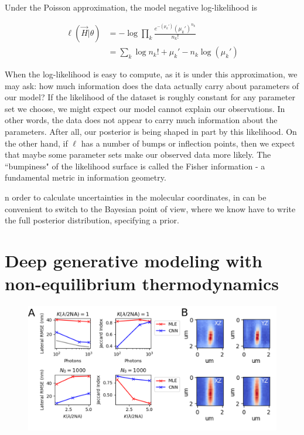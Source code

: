 \documentclass{ucetd}
\begin{document}
Under the Poisson approximation, the model negative log-likelihood is

\begin{align}
\ell(\vec{H}|\theta) &= -\log \prod_{k} \frac{e^{-\left(\mu_{k}'\right)}\left(\mu_{k}'\right)^{n_{k}}}{n_{k}!}\\
&= \sum_{k}  \log n_{k}! + \mu_{k}' - n_{k}\log\left(\mu_{k}'\right)
\end{align}

When the log-likelihood is easy to compute, as it is under this approximation, we may ask: how much information does the data actually carry about parameters of our model? If the likelihood of the dataset is roughly constant for any parameter set we choose, we might expect our model cannot explain our observations. In other words, the data does not appear to carry much information about the parameters. After all, our posterior is being shaped in part by this likelihood. On the other hand, if $\ell$ has a number of bumps or inflection points, then we expect that maybe some parameter sets make our observed data more likely. The ``bumpiness" of the likelihood surface is called the Fisher information - a fundamental metric in information geometry. 

n order to calculate uncertainties in the molecular coordinates, in can be convenient to switch to the Bayesian point of view, where we know have to write the full posterior distribution, specifying a prior.


\section{Deep generative modeling with non-equilibrium thermodynamics}

\begin{figure}
\begin{center}
\includegraphics[width=16cm]{PSF2D.png}
\end{center}
\end{figure}
\end{document}
